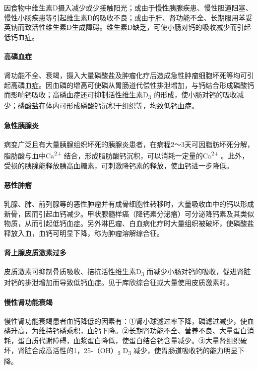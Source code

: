 因食物中维生素D摄入减少或少接触阳光；或由于慢性胰腺疾患、慢性胆道阻塞、慢性小肠疾患等引起维生素D的吸收不良；或由于肝、肾功能不全、长期服用苯妥英钠而致活性维生素D生成障碍。维生素D缺乏，可使小肠对钙的吸收减少而引起低钙血症。

\paragraph{高磷血症}

肾功能不全、衰竭，摄入大量磷酸盐及肿瘤化疗后造成急性肿瘤细胞坏死等均可引起高磷血症。因血磷的增高可使磷从胃肠道代偿性排泄增加，与钙结合形成磷酸钙而影响钙吸收；高磷血症还可抑制活性维生素D\textsubscript{3}
的形成，使小肠对钙的吸收减少；磷酸盐在体内可形成磷酸钙沉积于组织等，均致低钙血症。

\paragraph{急性胰腺炎}

病变广泛且有大量胰腺组织坏死的胰腺炎患者，在病程2～3天可因脂肪坏死分解，脂肪酸与血中Ca\textsuperscript{2+}
结合，形成脂肪酸钙沉积，可以消耗一定量的Ca\textsuperscript{2+}
。此外，受损的胰腺能释放胰高血糖素，可刺激降钙素的释放，使血钙进一步降低。

\paragraph{恶性肿瘤}

乳腺、肺、前列腺等的恶性肿瘤并有成骨细胞性转移时，大量吸收血中的钙以形成新骨，因而引起血钙减少。甲状腺髓样癌（降钙素分泌瘤）可分泌降钙素及其类似物质，从而引起低钙血症。另外淋巴瘤、白血病化疗时大量组织被破坏，使磷酸盐释放入血，血钙可明显下降，称为肿瘤溶解综合征。

\paragraph{肾上腺皮质激素过多}

皮质激素可抑制骨质吸收、拮抗活性维生素D\textsubscript{3}
而减少小肠对钙的吸收，促进肾脏对钙的排泄增加而导致低钙血症。见于库欣综合征或大量使用皮质激素时。

\paragraph{慢性肾功能衰竭}

慢性肾功能衰竭患者血钙降低的因素有：①肾小球滤过率下降，磷滤过减少，使血磷升高，为维持钙磷乘积，血钙下降。②长期肾功能不全、营养不良、大量蛋白消耗，蛋白质代谢障碍，血浆蛋白降低，使蛋白结合钙含量减少。③大量肾组织破坏，肾脏合成高活性的1，25-（OH）\textsubscript{2}
D\textsubscript{3} 减少，使胃肠道吸收钙的能力明显下降。

